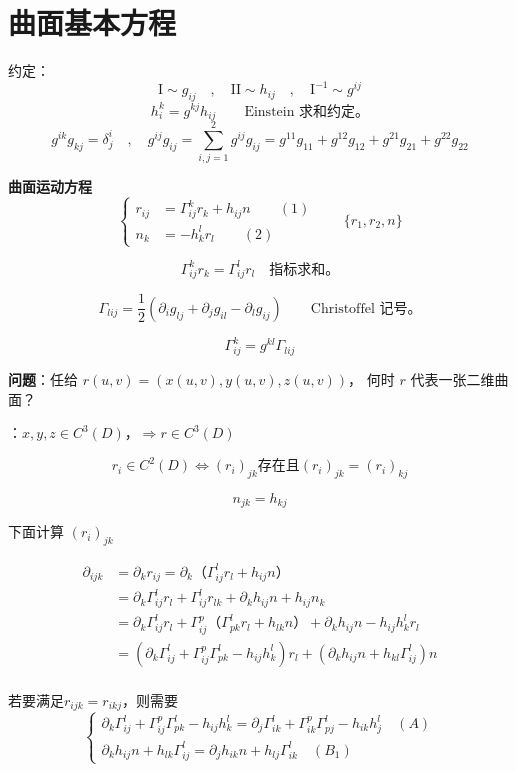 \documentclass[lang=cn,10pt,thmcnt=section]{elegantbook}
\begin{document}
\section{曲面基本方程}
约定：
\[
\mathrm{I} \sim g_{ij} \quad , \quad \mathrm{II} \sim h_{ij} \quad , \quad \mathrm{I}^{-1} \sim g^{ij}
\]
\[
h^k_i = g^{kj} h_{ij} \qquad \text{Einstein 求和约定。}
\]
\[
g^{ik} g_{kj} = \delta^i_j \quad , \quad g^{ij} g_{ij} = \sum_{i,j=1}^{2} g^{ij} g_{ij} = g^{11} g_{11} + g^{12} g_{12} + g^{21} g_{21} + g^{22} g_{22}
\]

\textbf{曲面运动方程}
\[
\left\{
\begin{aligned}
    r_{ij} &= \Gamma_{ij}^k r_k + h_{ij} n \quad \quad (1) \\
    n_k &= -h_k^l r_l \quad \quad (2)
\end{aligned}
\right.
\qquad \{r_1, r_2, n\}
\]

\[
\Gamma_{ij}^k r_k = \Gamma_{ij}^l r_l \quad \text{指标求和。}
\]

\[
\Gamma_{lij} = \frac{1}{2} \left( \partial_i g_{lj} + \partial_j g_{il} - \partial_l g_{ij} \right) \qquad \text{Christoffel 记号。}
\]

\[
\Gamma_{ij}^k = g^{kl} \Gamma_{lij}
\]

\textbf{问题}：任给 $r(u,v) = (x(u,v), y(u,v), z(u,v))$，  
何时 $r$ 代表一张二维曲面？

：$x, y, z \in C^3(D)$，$\Rightarrow r \in C^3(D)$

\[
r_i \in C^2(D) \iff (r_i)_{jk} \text{存在且}(r_i)_{jk} = (r_i)_{kj}
\]



\[
n_{jk} = h_{kj}
\]

下面计算 $(r_{i})_{jk}$

\begin{align*}
    \partial_{ijk}&=\partial_{k}r_{ij}=\partial_{k}（\Gamma_{ij}^l r_l + h_{ij} n）\\
    &= \partial_{k} \Gamma_{ij}^l r_l + \Gamma_{ij}^l r_{lk} + \partial_{k} h_{ij} n + h_{ij} n_{k}\\
    &=\partial_{k} \Gamma_{ij}^l r_l +\Gamma_{ij}^p（\Gamma_{pk}^l r_l + h_{lk} n）+ \partial_{k} h_{ij} n - h_{ij}h^l_k r_{l}\\
    &=(\partial_{k} \Gamma_{ij}^l+\Gamma_{ij}^p\Gamma_{pk}^l-h_{ij}h^l_k)r_l+(\partial_{k} h_{ij} n + h_{kl}\Gamma_{ij}^l)n\\
\end{align*}

若要满足$r_{ijk}=r_{ikj}$，则需要
\[
\begin{cases}
    \partial_{k} \Gamma_{ij}^l+\Gamma_{ij}^p\Gamma_{pk}^l-h_{ij}h^l_k=\partial_{j} \Gamma_{ik}^l+\Gamma_{ik}^p\Gamma_{pj}^l-h_{ik}h^l_j\quad(A)\\
    \partial_{k} h_{ij} n + h_{lk}\Gamma_{ij}^l= \partial_{j} h_{ik} n + h_{lj}\Gamma_{ik}^l\quad(B_1)\label{B1}
\end{cases}
\]
\end{document}
